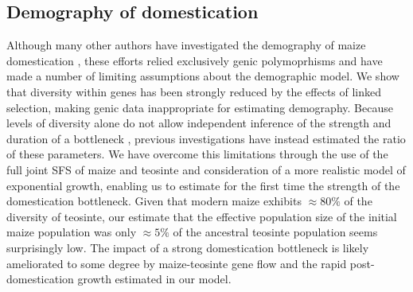 \documentclass{pnastwo}
\begin{document}
\begin{article}


\color{black}


\subsection{Demography of domestication}

Although many other authors have investigated the demography of maize domestication \cite{eyre1998, tenaillon2004selection, wright2005}, these  efforts relied  exclusively genic polymoprhisms and have made a number of limiting assumptions about the demographic model.  
We show that diversity within genes has been strongly reduced by the effects of linked selection, making genic data inappropriate for estimating demography.
Because levels of diversity alone do not allow independent inference of the strength and duration of a bottleneck \cite{tenaillon2004selection}, previous investigations have instead estimated the ratio of these parameters.  
We have overcome this limitations through the use of the full joint SFS of maize and teosinte and consideration of a more realistic model of exponential growth, enabling us to estimate for the first time the strength of the domestication bottleneck.  
Given that modern maize exhibits $\approx 80\%$ of the diversity of teosinte, our estimate that  the effective population size of the initial maize  population was only $\approx 5\%$ of the ancestral teosinte population seems surprisingly low.
The impact of a strong domestication bottleneck is likely ameliorated to some degree by  maize-teosinte gene flow and the rapid post-domestication growth estimated in our model.   


\end{article}
\end{document}
